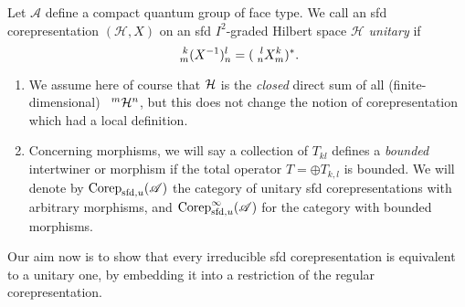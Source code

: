 
\begin{Def} Let $\mathscr{A}$ define a compact quantum group of face type. We call an sfd corepresentation $(\mathcal{H},X)$ on an sfd $I^2$-graded Hilbert space $\mathcal{H}$
\emph{unitary} if \[\Gr{(X^{-1})}{k}{l}{m}{n}=(\Gr{X}{l}{k}{n}{m})^{*}.\]  
\end{Def} 
\begin{Rem} \begin{enumerate} \item We assume here of course that $\Hsp$ is the \emph{closed} direct sum of all (finite-dimensional) $\Gru{\Hsp}{m}{n}$, but this does not change the notion of corepresentation which had a local definition.
\item Concerning morphisms, we will say a collection of $T_{kl}$ defines a \emph{bounded} intertwiner or morphism if the total operator $T= \oplus T_{k,l}$ is bounded. We will denote by $\Corep_{\sfd,u}(\mathscr{A})$ the category of unitary sfd corepresentations with arbitrary morphisms, and $\Corep_{\sfd,u}^{\infty}(\mathscr{A})$ for the category with bounded morphisms.
\end{enumerate}
\end{Rem}

Our aim now is to show that every irreducible sfd corepresentation is
equivalent to a unitary one, by embedding it into a restriction of the
regular corepresentation.

